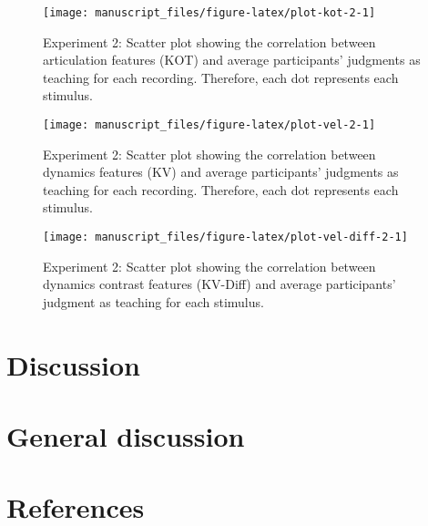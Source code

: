 \documentclass[
  man,floatsintext]{apa6}
\begin{document}
\begin{figure}

{\centering \texttt{[image: manuscript\_files/figure-latex/plot-kot-2-1]} 

}

\caption{\label{fig:kot-2}Experiment 2: Scatter plot showing the correlation between articulation features (KOT) and average participants' judgments as teaching for each recording. Therefore, each dot represents each stimulus.}\label{fig:plot-kot-2}
\end{figure}

\begin{figure}

{\centering \texttt{[image: manuscript\_files/figure-latex/plot-vel-2-1]} 

}

\caption{\label{fig:vel-2}Experiment 2: Scatter plot showing the correlation between dynamics features (KV) and average participants' judgments as teaching for each recording. Therefore, each dot represents each stimulus.}\label{fig:plot-vel-2}
\end{figure}

\begin{figure}

{\centering \texttt{[image: manuscript\_files/figure-latex/plot-vel-diff-2-1]} 

}

\caption{\label{fig:vel-diff-2}Experiment 2: Scatter plot showing the correlation between dynamics contrast features (KV-Diff) and average participants' judgment as teaching for each stimulus.}\label{fig:plot-vel-diff-2}
\end{figure}

\hypertarget{discussion-1}{%
\section{Discussion}\label{discussion-1}}

\hypertarget{general-discussion}{%
\section{General discussion}\label{general-discussion}}

\newpage

\hypertarget{references}{%
\section{References}\label{references}}
\end{document}
